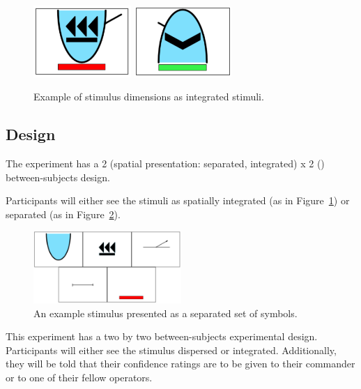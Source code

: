 \documentclass[doc, a4paper, apacite]{apa6}
\begin{document}
\begin{figure}
	\centering
	\includegraphics[width=0.33\textwidth]{images/integratedStimulusExample}
	\includegraphics[width=0.33\textwidth]{images/integratedStimulusExample2}
	\caption{Example of stimulus dimensions as integrated stimuli.}
	\label{fig:integratedStimuli}
\end{figure}

\subsection{Design}
The experiment has a 2 (spatial presentation: separated, integrated) x 2 () between-subjects design. 

Participants will either see the stimuli as spatially integrated (as in Figure~\ref{fig:integratedStimuli}) or separated (as in Figure~\ref{fig:separatedStimulus}). 

\begin{figure}
	\centering	
	\includegraphics[width=0.5\textwidth]{images/separatedStimulusExample}
	\caption{An example stimulus presented as a separated set of symbols.}
	\label{fig:separatedStimulus}	
\end{figure}

This experiment has a two by two between-subjects experimental design. 
Participants will either see the stimulus dispersed or integrated. 
Additionally, they will be told that their confidence ratings are to be given to their commander or to one of their fellow operators. 
\end{document}
